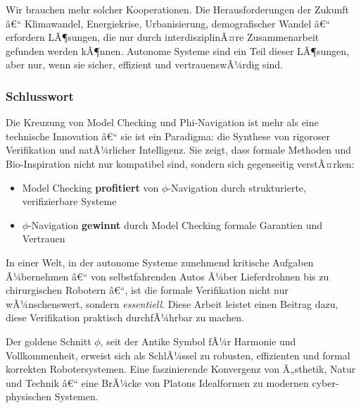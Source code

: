 ﻿\documentclass[a4paper,12pt]{article}
\theoremstyle{definition}
\begin{document}
Wir brauchen mehr solcher Kooperationen. Die Herausforderungen der Zukunft â€“ Klimawandel, Energiekrise, Urbanisierung, demografischer Wandel â€“ erfordern LÃ¶sungen, die nur durch interdisziplinÃ¤re Zusammenarbeit gefunden werden kÃ¶nnen. Autonome Systeme sind ein Teil dieser LÃ¶sungen, aber nur, wenn sie sicher, effizient und vertrauenswÃ¼rdig sind.

\subsubsection{Schlusswort}

Die Kreuzung von Model Checking und Phi-Navigation ist mehr als eine technische Innovation â€“ sie ist ein Paradigma: die Synthese von rigoroser Verifikation und natÃ¼rlicher Intelligenz. Sie zeigt, dass formale Methoden und Bio-Inspiration nicht nur kompatibel sind, sondern sich gegenseitig verstÃ¤rken:

\begin{itemize}
	\item Model Checking \textbf{profitiert} von $\phi$-Navigation durch strukturierte, verifizierbare Systeme
	\item $\phi$-Navigation \textbf{gewinnt} durch Model Checking formale Garantien und Vertrauen
\end{itemize}

In einer Welt, in der autonome Systeme zunehmend kritische Aufgaben Ã¼bernehmen â€“ von selbstfahrenden Autos Ã¼ber Lieferdrohnen bis zu chirurgischen Robotern â€“, ist die formale Verifikation nicht nur wÃ¼nschenswert, sondern \textit{essentiell}. Diese Arbeit leistet einen Beitrag dazu, diese Verifikation praktisch durchfÃ¼hrbar zu machen.

Der goldene Schnitt $\phi$, seit der Antike Symbol fÃ¼r Harmonie und Vollkommenheit, erweist sich als SchlÃ¼ssel zu robusten, effizienten und formal korrekten Robotersystemen. Eine faszinierende Konvergenz von Ã„sthetik, Natur und Technik â€“ eine BrÃ¼cke von Platons Idealformen zu modernen cyber-physischen Systemen.
\end{document}
